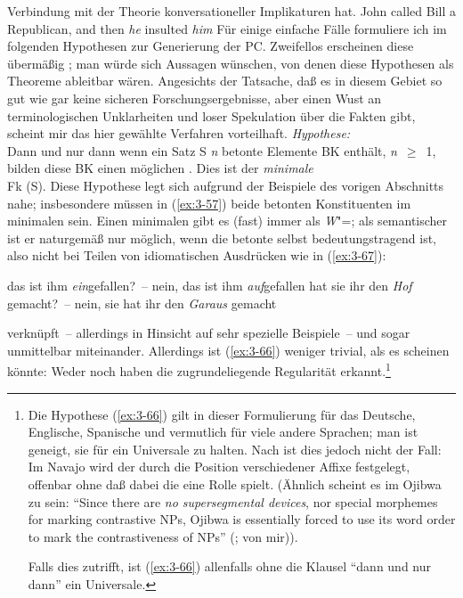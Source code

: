 \documentclass[output=paper]{langsci/langscibook}
\begin{document}
Verbindung mit der Theorie konversationeller Implikaturen hat.
\ea
\label{ex:3-65}
John called Bill a Republican, and then \textit{he} insulted \textit{him}
\z
Für einige einfache Fälle formuliere ich im folgenden Hypothesen zur
Generierung der PC. Zweifellos erscheinen diese übermäßig
; man würde sich Aussagen wünschen, von denen
diese Hypothesen als Theoreme ableitbar wären. Angesichts der
Tatsache, daß es in diesem Gebiet so gut wie gar keine sicheren
Forschungsergebnisse, aber einen Wust an terminologischen Unklarheiten
und loser Spekulation über die Fakten gibt, scheint mir das hier
gewählte Verfahren vorteilhaft.
\ea
\label{ex:3-66}
\textit{Hypothese:}\\
Dann und nur dann wenn ein Satz S \textit{n} betonte Elemente BK enthält,
\emph{n}~$\geq$~1, bilden diese BK einen möglichen . Dies ist der
\textit{minimale}\\
Fk (S).
\z
Diese Hypothese legt sich aufgrund der Beispiele des vorigen
Abschnitts nahe; insbesondere müssen in (\ref{ex:3-57}) beide betonten
Konstituenten im minimalen  sein. Einen minimalen  gibt es
(fast) immer als \textit{W}"=; als semantischer  ist er naturgemäß
nur möglich, wenn die betonte  selbst bedeutungstragend
ist, also nicht \zb bei Teilen von idiomatischen Ausdrücken wie in
(\ref{ex:3-67}):
\begin{exe}
\ex
\label{ex:3-67}
\begin{xlist}
\ex
\label{ex:3-67a}
das ist ihm \textit{ein}gefallen?~--  nein, das ist ihm \textit{auf}gefallen
\ex
\label{ex:3-67b}
hat sie ihr den \textit{Hof} gemacht?~--  nein, sie hat ihr den \textit{Garaus} gemacht
\end{xlist}
\end{exe}
\citet[192f]{Kempson75} verknüpft~-- allerdings in Hinsicht auf
sehr spezielle Beispiele~--  und
 sogar unmittelbar
miteinander. Allerdings ist (\ref{ex:3-66}) weniger trivial, als es scheinen
könnte: Weder \citet{Bartsch76} noch \citet{Smyth79} haben die
zugrundeliegende Regularität erkannt.\footnote{\label{fn:3-19}%
  Die Hypothese (\ref{ex:3-66}) gilt in dieser Formulierung für das Deutsche, Englische, Spanische
  und vermutlich für viele andere Sprachen; man ist geneigt, sie für ein Universale zu halten. Nach
  \citet{Schauber78} ist dies jedoch nicht der Fall: Im Navajo wird der  durch die Position
  verschiedener Affixe festgelegt, offenbar ohne daß dabei die  eine Rolle spielt. (Ähnlich
  scheint es im Ojibwa zu sein: "`Since there are \textit{no supersegmental devices}, nor special
  morphemes for marking contrastive NPs, Ojibwa is essentially forced to use its word order to
  mark the contrastiveness of NPs"' (\citet[317]{Tomlin79};  von mir)).

  Falls dies zutrifft, ist (\ref{ex:3-66}) allenfalls ohne die Klausel "`dann und nur dann"' ein Universale.%
}
\end{document}
